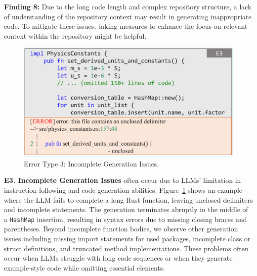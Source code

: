 \secmargin
\begin{myboxc} \textbf{Finding 8: } %
Due to the long code length and complex repository structure, a lack of understanding of the repository context may result in generating inappropriate code. To mitigate these issues, taking measures to enhance the focus on relevant context within the repository might be helpful.
\end{myboxc} %

\secmargin



\begin{figure}
    \centering
    \includegraphics[width=\linewidth]{figures/E3.pdf}
    \figmargin
    \caption{Error Type 3: Incomplete Generation Issues.}
    \figmargin
    \label{fig:ErrorType3}
\end{figure}


\textbf{E3. Incomplete Generation Issues} often occur due to LLMs' limitation in instruction following and code generation abilities. 
Figure~\ref{fig:ErrorType3} shows an example where the LLM fails to complete a long Rust function, leaving unclosed delimiters and incomplete statements. The generation terminates abruptly in the middle of a \texttt{HashMap} insertion, resulting in syntax errors due to missing closing braces and parentheses.
Beyond incomplete function bodies, we observe other generation issues including missing import statements for used packages, incomplete class or struct definitions, and truncated method implementations. These problems often occur when LLMs struggle with long code sequences or when they generate example-style code while omitting essential elements.

